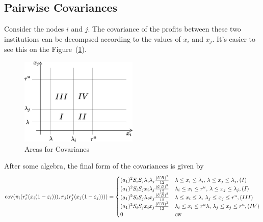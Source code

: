 \subsection{Pairwise Covariances}
Consider the nodes $i$ and $j$.  The covariance of the profits between these two institutions can be decompsed according to the values of $x_i$ and $x_j$.  It's easier to see this on the Figure~(\ref{figcovzones}).

\begin{figure}[htbp]
   \centering
   \includegraphics[width=0.5\textwidth]{CovAreas} %
   \caption{Areas for Covarianes}
   \label{figcovzones}
\end{figure}

After some algebra, the final form of the covariances is given by
\begin{equation}\label{eqcovij}
{\mathop{\rm cov}\nolimits}(\pi_i(r^*_i(x_i(1-\varepsilon_i))),\pi_j(r^*_j(x_j(1-\varepsilon_j))))=\begin{cases}
(a_1)^2S_iS_j\lambda_i\lambda_j\frac{(UB)^2}{12}&\lambda\leq x_i\leq\lambda_i,\,\lambda\leq x_j\leq\lambda_j,(I)\\
(a_1)^2S_iS_j x_i\lambda_j\frac{(UB)^2}{12}&\lambda_i\leq x_i\leq r^u,\,\lambda\leq x_j\leq\lambda_j,(I)\\
(a_1)^2S_iS_j \lambda_i x_j\frac{(UB)^2}{12}&\lambda\leq x_i\leq \lambda,\,\lambda_j\leq x_j\leq r^u,(III)\\
(a_1)^2S_iS_j x_i x_j\frac{(UB)^2}{12}&\lambda_i\leq x_i \leq r^u \lambda,\,\lambda_j\leq x_j\leq r^u,(IV)\\
0&{\rm ow}
\end{cases}
\end{equation}